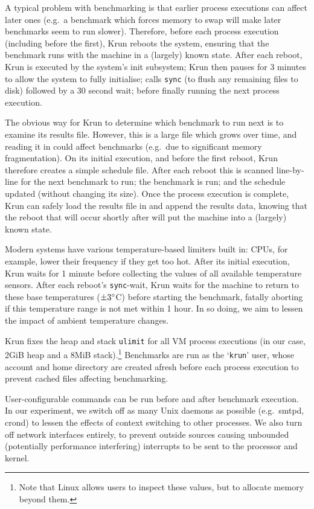 \documentclass[preprint,numbers,10pt]{sigplanconf}
\newcommand{\krun}{Krun\xspace}
\begin{document}
A typical problem with benchmarking is that earlier process executions can
affect later ones (e.g.~a benchmark which forces memory to swap will make
later benchmarks seem to run slower). Therefore, before each process execution
(including before the first), \krun reboots the system, ensuring that the
benchmark runs with the machine in a (largely) known state. After each reboot, \krun is
executed by the system's init subsystem; \krun then pauses for 3
minutes to allow the system to fully initialise; calls \texttt{sync} (to
flush any remaining files to disk) followed by a 30 second wait; before finally running the
next process execution.

The obvious way for \krun to determine which benchmark to run next is to examine
its results file. However, this is a large file which grows over time, and
reading it in could affect benchmarks (e.g.~due to significant memory
fragmentation). On its initial execution, and before the first reboot, \krun
therefore creates a simple schedule file. After each reboot this is scanned
line-by-line for the next benchmark to run; the benchmark is run; and the schedule
updated (without changing its size). Once the process execution is
complete, \krun can safely load the results file in and append the results data,
knowing that the reboot that will occur shortly after will put the machine into
a (largely) known state.

Modern systems have various temperature-based limiters built in:
CPUs, for example, lower their frequency if they get too hot.
After its initial execution, \krun waits for 1 minute before collecting
the values of all available temperature sensors. After each reboot's \texttt{sync}-wait, \krun waits
for the machine to return to these base temperatures ($\pm3\degree$C) before
starting the benchmark, fatally aborting if this temperature range is not
met within 1 hour. In so doing, we aim to lessen the impact of ambient temperature changes.

\krun fixes the heap and stack \texttt{ulimit} for all VM process executions
(in our case, 2GiB heap and a 8MiB stack).\footnote{Note that Linux allows users
to inspect these values, but to allocate memory beyond them.} Benchmarks are run
as the `\texttt{krun}' user, whose account and home directory are created
afresh before each process execution to prevent cached files affecting benchmarking.

User-configurable commands can be run before and after benchmark execution. In
our experiment, we switch off as many Unix daemons as possible (e.g.~smtpd,
crond) to lessen the effects of context switching to other processes. We also
turn off network interfaces entirely, to prevent outside sources causing unbounded
(potentially performance interfering) interrupts to be sent to the processor and kernel.
\end{document}
